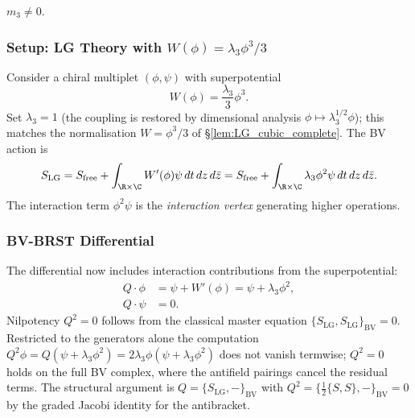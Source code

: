 $m_3 \neq 0$.

\subsubsection{Setup: LG Theory with $W(\phi) = \lambda_3 \phi^3/3$}

Consider a chiral multiplet $(\phi, \psi)$ with superpotential
\[
W(\phi) = \frac{\lambda_3}{3} \phi^3.
\]
Set $\lambda_3 = 1$ (the coupling is restored by dimensional analysis $\phi \mapsto \lambda_3^{1/2}\phi$); this matches the normalisation $W = \phi^3/3$ of \S\ref{lem:LG_cubic_complete}.
The BV action is
\[
S_{\text{LG}} = S_{\text{free}} + \int_{\R \times \C} W'(\phi) \psi \, dt \, dz \, d\bar{z} = S_{\text{free}} + \int_{\R \times \C} \lambda_3 \phi^2 \psi \, dt \, dz \, d\bar{z}.
\]
The interaction term $\phi^2 \psi$ is the \emph{interaction vertex} generating higher operations.

\subsubsection{BV-BRST Differential}

The differential now includes interaction contributions from the superpotential:
\begin{align}
Q \cdot \phi &= \psi + W'(\phi) = \psi + \lambda_3 \phi^2, \\
Q \cdot \psi &= 0.
\end{align}
Nilpotency $Q^2 = 0$ follows from the classical master equation $\{S_{\text{LG}}, S_{\text{LG}}\}_{\mathrm{BV}} = 0$. Restricted to the generators alone the computation $Q^2\phi = Q(\psi + \lambda_3\phi^2) = 2\lambda_3\phi(\psi + \lambda_3\phi^2)$ does not vanish termwise; $Q^2 = 0$ holds on the full BV complex, where the antifield pairings cancel the residual terms. The structural argument is $Q = \{S_{\mathrm{LG}}, -\}_{\mathrm{BV}}$ with $Q^2 = \{\tfrac{1}{2}\{S,S\}, -\}_{\mathrm{BV}} = 0$ by the graded Jacobi identity for the antibracket.

